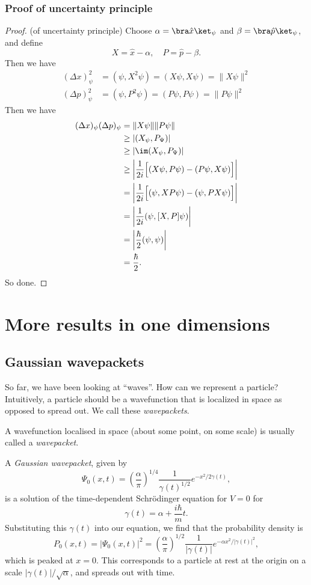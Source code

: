 \documentclass[a4paper]{article}
\begin{document}
\subsubsection*{Proof of uncertainty principle}
\begin{proof}(of uncertainty principle)
  Choose $\alpha = \bra \hat{x}\ket _\psi$ and $\beta = \bra \hat{p}\ket_\psi$, and define
  \[
    X = \hat{x} - \alpha,\quad P = \hat{p} - \beta.
  \]
  Then we have
  \begin{align*}
    (\Delta x)_\psi^2 &= (\psi, X^2 \psi) = (X\psi, X\psi) = \|X\psi\|^2\\
    (\Delta p)_\psi^2 &= (\psi, P^2 \psi) = (P\psi, P\psi) = \|P\psi\|^2
  \end{align*}
  Then we have
  \begin{align*}
    (\Delta x)_\psi (\Delta p)_\psi &= \|X\psi\|\|P\psi\|\\
    &\geq |(X_\psi, P_\Psi)|\\
    &\geq |\im(X_\psi, P_\Psi)|\\
    &\geq \left|\frac{1}{2i}\Big[(X\psi, P\psi) - (P\psi, X\psi)\Big]\right|\\
    &= \left|\frac{1}{2i}\Big[(\psi, XP\psi) - (\psi, PX\psi)\Big]\right|\\
    &= \left|\frac{1}{2i}(\psi, [X, P]\psi)\right|\\
    &= \left|\frac{\hbar}{2}(\psi, \psi)\right|\\
    &= \frac{\hbar}{2}.
  \end{align*}
  So done.
\end{proof}
\section{More results in one dimensions}
\subsection{Gaussian wavepackets}
So far, we have been looking at ``waves''. How can we represent a particle? Intuitively, a particle should be a wavefunction that is localized in space as opposed to spread out. We call these \emph{wavepackets}.

\begin{defi}[Wavepacket]
  A wavefunction localised in space (about some point, on some scale) is usually called a \emph{wavepacket}.
\end{defi}

A \emph{Gaussian wavepacket}, given by
\[
  \Psi_0(x, t) = \left(\frac{\alpha}{\pi}\right)^{1/4} \frac{1}{\gamma(t)^{1/2}} e^{-x^2/2\gamma(t)},
\]
is a solution of the time-dependent Schr\"odinger equation for $V = 0$ for
\[
  \gamma(t) = \alpha + \frac{i\hbar}{m} t.
\]
Substituting this $\gamma(t)$ into our equation, we find that the probability density is
\[
  P_0(x, t) = |\Psi_0(x, t)|^2 = \left(\frac{\alpha}{\pi}\right)^{1/2} \frac{1}{|\gamma(t)|} e^{-\alpha x^2/|\gamma(t)|^2},
\]
which is peaked at $x = 0$. This corresponds to a particle at rest at the origin on a scale $|\gamma(t)|/\sqrt{\alpha}$, and spreads out with time.
\end{document}
